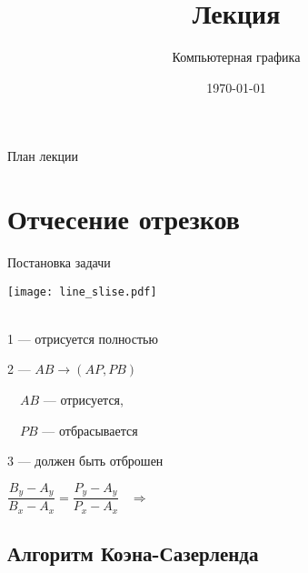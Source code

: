 \documentclass[10pt]{beamer}
\date{\today}
\title{Лекция \lecdni \\ \LectionTheme}
\subtitle{Компьютерная графика}
\begin{document}
 		 


\newcommand \abs[1] {\left| #1 \right|}


\begin{comment}
\end{comment}

    
    \QRFRAME	
	
	
	\frame{\maketitle}
	
	
	
	\begin{frame}{План лекции}
		\tableofcontents
	\end{frame}
	

	
	\section{Отчесение отрезков}	
	\frame{\sectionpage}
	
	
	\begin{frame}{Постановка задачи}
		
		\begin{center}
			{
				\texttt{[image: line\_slise.pdf]}
			}
			{
				~ \\
				
				1 --- отрисуется полностью
				
				2 --- $AB \rightarrow (AP, PB)$ 
				
				\ \ $AB$ --- отрисуется,
				
				\ \ $PB$ --- отбрасывается
				
				
				3 --- должен быть отброшен
			
			}
			
		\end{center}
		
		$\dfrac{B_y-A_y}{B_x-A_x} = \dfrac{P_y-A_y}{P_x-A_x}$
		~$\Rightarrow$~ 
		

		
		
	\end{frame}
	
	
	\subsection{Алгоритм Коэна-Сазерленда}		
	
\end{document}
